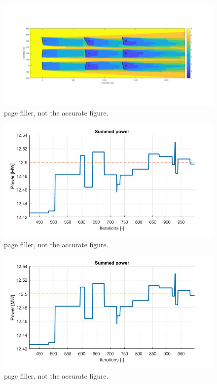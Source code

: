  \begin{figure}
 	\includegraphics[width=\linewidth]{./Figures/plotje.png}
 	\caption{page filler, not the accurate figure.}
 	\label{fig:case3turbs}
 \end{figure}

\begin{figure}
	\includegraphics[width=\linewidth]{./Figures/sumpowerexample.png}
	\caption{page filler, not the accurate figure.}
	\label{fig:case1power}
\end{figure}

\begin{figure}
 \includegraphics[width=\linewidth]{./Figures/sumpowerexample.png}
 \caption{page filler, not the accurate figure.}
 \label{fig:case2power}
\end{figure}

